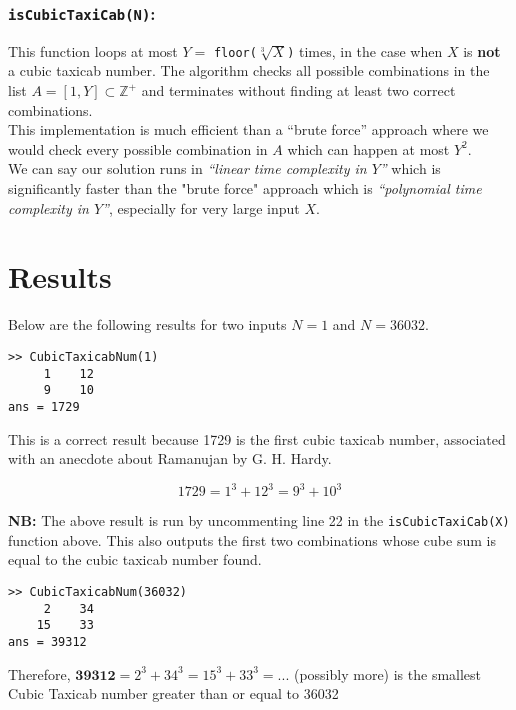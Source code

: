 \documentclass[11pt]{report}
\begin{document}
\subsubsection{\texttt{isCubicTaxiCab(N)}:}
This function loops at most $Y=$ \texttt{floor($\sqrt[3]{X}$)} times, in the case when $X$ is \textbf{not} a cubic taxicab number. The algorithm checks all possible combinations in the list $A=[1,Y]\subset\mathbb{Z^+}$ and terminates without finding at least two correct combinations. \\

This implementation is much efficient than a ``brute force'' approach where we would check every possible combination in $A$ which can happen at most $Y^2$. \\

We can say our solution runs in \textit{``linear time complexity in $Y$''} which is significantly faster than the "brute force" approach which is \textit{``polynomial time complexity in $Y$''}, especially for very large input $X$.

\section{Results}
Below are the following results for two inputs $N=1$ and $N=36032$. \\

\begin{lstlisting}[title={N=1}]
>> CubicTaxicabNum(1)
     1    12
     9    10
ans = 1729
\end{lstlisting}

This is a correct result because 1729 is the first cubic taxicab number, associated with an anecdote about Ramanujan by G. H. Hardy.

\begin{equation*}
	1729 = 1^3 + 12^3 = 9^3 + 10^3
\end{equation*}

\textbf{NB:} The above result is run by uncommenting line 22 in the \texttt{isCubicTaxiCab(X)} function above. This also outputs the first two combinations whose cube sum is equal to the cubic taxicab number found. \\
\begin{lstlisting}[title={N=36032}]
>> CubicTaxicabNum(36032)
     2    34
    15    33
ans = 39312
\end{lstlisting}
Therefore, $\textbf{39312} = 2^3 +34^3 = 15^3 + 33^3 = ...$ (possibly more) is the smallest Cubic Taxicab number greater than or equal to 36032
\end{document}
